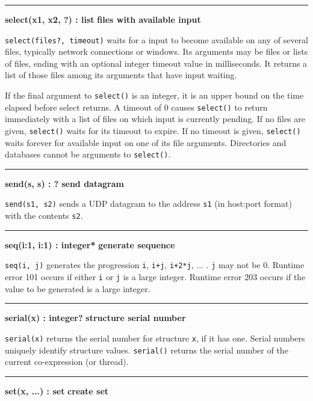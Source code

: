 \bigskip\hrule\vspace{0.1cm}
\noindent
{\bf select(x1, x2, ?) : list } \hfill {\bf files with available input}

\noindent
\texttt{select(files?, timeout)} waits for a input to become available
on any of several files, typically network connections or windows. Its
arguments may be files or lists of files, ending with an optional
integer timeout value in milliseconds. It returns a list of those files
among its arguments that have input waiting.

If the final argument to \texttt{select()} is an
integer, it is an upper bound on the time elapsed before select
returns. A timeout of 0 causes \texttt{select()} to return immediately
with a list of files on which input is currently pending. If no files
are given, \texttt{select()} waits for its timeout to expire. If no
timeout is given, \texttt{select()} waits forever for available input
on one of its file arguments. Directories and databases cannot be
arguments to \texttt{select()}.

\bigskip\hrule\vspace{0.1cm}
\noindent
{\bf send(s, s) : ? } \hfill {\bf send datagram}

\noindent
{}\texttt{send(s1, s2)} sends a UDP datagram to the
address \texttt{s1} (in host:port format) with the contents
\texttt{s2}.

\bigskip\hrule\vspace{0.1cm}
\noindent
{\bf seq(i:1, i:1) : integer* } \hfill {\bf generate sequence}

\noindent
{}\texttt{seq(i, j)} generates the
progression \texttt{i}, \texttt{i+j}, \texttt{i+2*j}, ... .
\texttt{j} may not be 0.  Runtime error 101 occurs if either
\texttt{i} or \texttt{j} is a large integer.  Runtime error 203
occurs if the value to be generated is a large integer.

\bigskip\hrule\vspace{0.1cm}
\noindent
{\bf serial(x) : integer? } \hfill {\bf structure serial number}

\noindent
{}\texttt{serial(x)} returns the serial number for
structure \texttt{x}, if it has one. Serial numbers uniquely identify
structure values. \texttt{serial()} returns the serial number of the
current co-expression (or thread).

\bigskip\hrule\vspace{0.1cm}
\noindent
{\bf set(x, ...) : set } \hfill {\bf create set}

